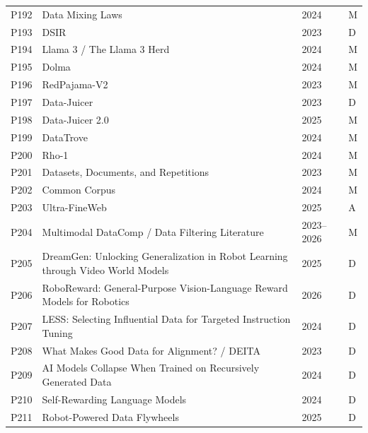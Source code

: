 \begin{longtable}{@{}p{1.3cm}p{11.8cm}p{2.2cm}p{1.2cm}@{}}
P192 & Data Mixing Laws & 2024 & M \\
P193 & DSIR & 2023 & D \\
P194 & Llama 3 / The Llama 3 Herd & 2024 & M \\
P195 & Dolma & 2024 & M \\
P196 & RedPajama-V2 & 2023 & M \\
P197 & Data-Juicer & 2023 & D \\
P198 & Data-Juicer 2.0 & 2025 & M \\
P199 & DataTrove & 2024 & M \\
P200 & Rho-1 & 2024 & M \\
P201 & Datasets, Documents, and Repetitions & 2023 & M \\
P202 & Common Corpus & 2024 & M \\
P203 & Ultra-FineWeb & 2025 & A \\
P204 & Multimodal DataComp / Data Filtering Literature & 2023–2026 & M \\
P205 & DreamGen: Unlocking Generalization in Robot Learning through Video World Models & 2025 & D \\
P206 & RoboReward: General-Purpose Vision-Language Reward Models for Robotics & 2026 & D \\
P207 & LESS: Selecting Influential Data for Targeted Instruction Tuning & 2024 & D \\
P208 & What Makes Good Data for Alignment? / DEITA & 2023 & D \\
P209 & AI Models Collapse When Trained on Recursively Generated Data & 2024 & D \\
P210 & Self-Rewarding Language Models & 2024 & D \\
P211 & Robot-Powered Data Flywheels & 2025 & D \\
\end{longtable}
